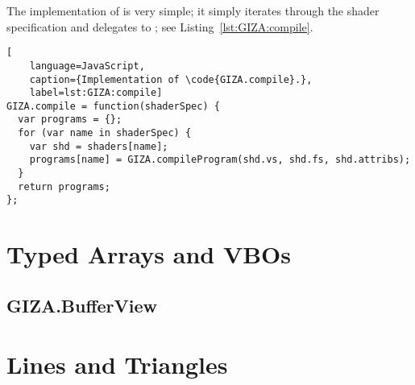 The implementation of  is very simple; it simply iterates through the shader specification and delegates to ; see Listing~\ref{lst:GIZA:compile}.

\begin{lstlisting}[
    language=JavaScript,
    caption={Implementation of \code{GIZA.compile}.},
    label=lst:GIZA:compile]
GIZA.compile = function(shaderSpec) {
  var programs = {};
  for (var name in shaderSpec) {
    var shd = shaders[name];
    programs[name] = GIZA.compileProgram(shd.vs, shd.fs, shd.attribs);
  }
  return programs;
};
\end{lstlisting}

\section{Typed Arrays and VBOs}
\label{sec:VBOs}


\subsection{GIZA.BufferView}

\section{Lines and Triangles}

